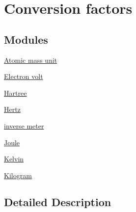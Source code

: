\hypertarget{group___conversion_factors}{}\section{Conversion factors}
\label{group___conversion_factors}
\subsection*{Modules}
\begin{DoxyCompactItemize}
\item 
\hyperlink{group___atomic_mass_unit}{Atomic mass unit}
\item 
\hyperlink{group___electron_volt}{Electron volt}
\item 
\hyperlink{group___hartree}{Hartree}
\item 
\hyperlink{group___hertz}{Hertz}
\item 
\hyperlink{group___inverse_meter}{inverse meter}
\item 
\hyperlink{group___joule}{Joule}
\item 
\hyperlink{group___kelvin}{Kelvin}
\item 
\hyperlink{group___kilogram}{Kilogram}
\end{DoxyCompactItemize}


\subsection{Detailed Description}
